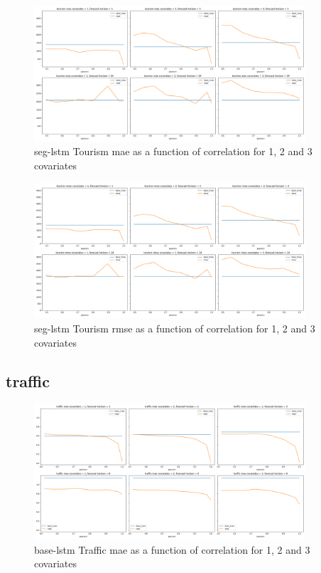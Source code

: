 \documentclass{article}
\begin{document}
  \begin{figure}[ht]
  \centering
  \includegraphics[width=0.9\textwidth]{figures/tourism-seg-lstm-mae.png}
  \caption{seg-lstm Tourism mae as a function of correlation for 1, 2 and 3 covariates}
  \label{fig:seg_lstm_tourism_mae}
  \end{figure}
  
  \begin{figure}[ht]
  \centering
  \includegraphics[width=0.9\textwidth]{figures/tourism-seg-lstm-rmse.png}
  \caption{seg-lstm Tourism rmse as a function of correlation for 1, 2 and 3 covariates}
  \label{fig:seg_lstm_tourism_rmse}
  \end{figure}

\subsection{traffic}
  \begin{figure}[htbp]
  \centering
  \includegraphics[width=0.9\textwidth]{figures/traffic-base-lstm-mae.png}
  \caption{base-lstm Traffic mae as a function of correlation for 1, 2 and 3 covariates}
  \label{fig:base_lstm_traffic_mae}
  \end{figure}
  
\end{document}
